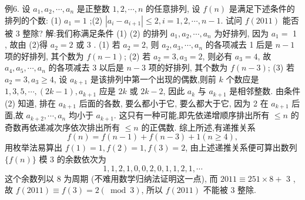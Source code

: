 例6. 设 $a_1, a_2, \cdots, a_n$ 是正整数 $1,2, \cdots, n$ 的任意排列, 设 $f(n)$ 是满足下述条件的排列的个数:
(1) $a_1=1$ ;(2) $\left|a_i-a_{i+1}\right| \leqslant 2, i=1,2, \cdots, n-1$.
试问 $f(2011)$ 能否被 3 整除?
解:我们称满足条件 (1) (2) 的排列 $a_1, a_2, \cdots, a_n$ 为好排列, 因为 $a_1=$ 1 , 故由 (2)得 $a_2=2$ 或 3 .
(1) 若 $a_2=2$, 则 $a_2, a_3, \cdots, a_n$ 的各项减去 1 后是 $n-1$ 项的好排列, 其个数为 $f(n-1)$;
(2) 若 $a_2=3, a_3=2$, 则必有 $a_3=4$, 故 $a_4, a_5, \cdots, a_n$ 的各项减去 3 以后是 $n-3$ 项的好排列, 其个数为 $f(n-3)$;
(3) 若 $a_2=3, a_3 \geqslant 4$, 设 $a_{k+1}$ 是该排列中第一个出现的偶数,则前 $k$ 个数应是 $1,3,5, \cdots,(2 k-1), a_{k+1}$ 应是 $2 k$ 或 $2 k-2$, 因此 $a_k$ 与 $a_{k+1}$ 是相邻整数.
由条件 (2) 知道, 排在 $a_{k+1}$ 后面的各数, 要么都小于它, 要么都大于它, 因为 2 在 $a_{k+1}$ 后面,故 $a_{k+2}, \cdots, a_n$ 均小于 $a_{k+1}$. 这只有一种可能,即先依递增顺序排出所有 $\leqslant n$ 的奇数再依递减次序依次排出所有 $\leqslant n$ 的正偶数.
综上所述,有递推关系
$$
f(n)=f(n-1)+f(n-3)+1(n \geqslant 4),
$$
用枚举法易算出 $f(1)=1, f(2)=1, f(3)=2$, 由上述递推关系便可算出数列 $\{f(n)\}$ 模 3 的余数依次为
$$
1,1,2,1,0,0,2,0,1,1,2,1, \cdots
$$
这个余数列以 8 为周期 (不难用数学归纳法证明这一点), 而 $2011 \equiv 251 \times 8+$ 3 , 故 $f(2011) \equiv f(3)=2(\bmod 3)$, 所以 $f(2011)$ 不能被 3 整除.




